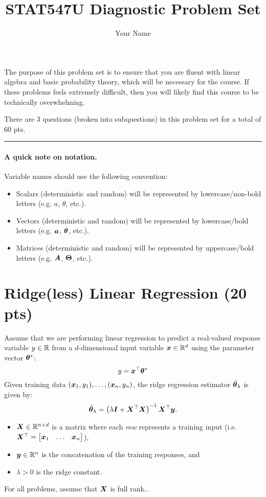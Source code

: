 \documentclass[11pt,letterpaper]{article}
\title{STAT547U Diagnostic Problem Set}
\author{Your Name}  %
\newcommand{\sectionbreak}{%
  \vspace{1em}
  \hrule
}
\newcommand{\doccolor}{gray}
\newcommand{\doccolor}{black}
\begin{document}
\maketitle

\color{\doccolor}
The purpose of this problem set is to ensure that you are fluent with linear algebra and basic probability theory,
which will be necessary for the course.
If these problems feels extremely difficult, then you will likely find this course to be technically overwhelming.

There are 3 questions (broken into subquestions) in this problem set for a total of 60 pts.

\sectionbreak

\paragraph{A quick note on notation.}
Variable names should use the following convention:
\begin{itemize}
  \item Scalars (deterministic and random) will be represented by lowercase/non-bold letters (e.g. $a$, $\theta$, etc.).
  \item Vectors (deterministic and random) will be represented by lowercase/bold letters (e.g. ${\bm{a}}$, ${\bm{\theta}}$, etc.).
  \item Matrices (deterministic and random) will be represented by uppercase/bold letters (e.g. ${\bm{A}}$, ${\bm{\Theta}}$, etc.).
\end{itemize}



\section{Ridge(less) Linear Regression (20 pts)}

Assume that we are performing linear regression
to predict a real-valued response variable $y \in \mathbb{R}$ from
a $d$-dimensional input variable ${\bm{x}} \in \mathbb{R}^d$
using the parameter vector ${\bm{\theta}}^*$:
%
\[
  y = {\bm{x}}^\top {\bm{\theta}}^*
\]
%
Given training data $({\bm{x}}_1, y_1), \ldots, ({\bm{x}}_n, y_n)$,
the ridge regression estimator $\hat{{\bm{\theta}}}_\lambda$ is given by:
%
\begin{equation}
  \hat{{\bm{\theta}}}_\lambda = \left( \lambda {\bm{I}} + {\bm{X}}^\top {\bm{X}} \right)^{-1} {\bm{X}}^\top {\bm{y}}.
  \label{eqn:ridge_std}
\end{equation}
%
\begin{itemize}
  \item ${\bm{X}} \in \mathbb{R}^{n \times d}$ is a matrix where each \emph{row} represents a training input
    (i.e. ${\bm{X}}^\top = \begin{bmatrix} {\bm{x}}_1 & \ldots & {\bm{x}}_n \end{bmatrix}$),
  \item ${\bm{y}} \in \mathbb{R}^n$ is the concatenation of the training responses, and
  \item $\lambda > 0$ is the ridge constant.
\end{itemize}
%
For all problems, assume that ${\bm{X}}$ is full rank..
\end{document}
